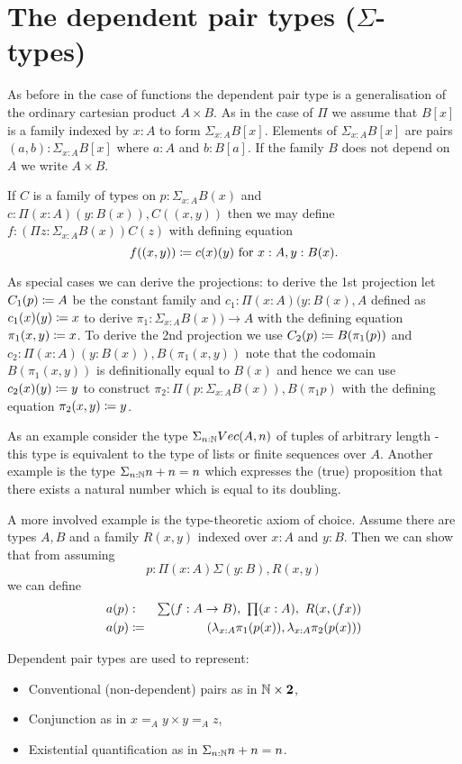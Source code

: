 \section{The dependent pair types ($\Sigma$-types)}

As before in the case of functions the dependent pair type is a
generalisation of the ordinary cartesian product $A \times B$. 
As in the case of $\Pi$ we assume that $B[x]$ is a family indexed by
$x:A$ to form $\Sigma_{x:A}B[x]$. Elements of $\Sigma_{x:A}B[x]$ are
pairs $(a,b) : \Sigma_{x:A}B[x]$ where $a:A$ and $b:B[a]$. If the
family $B$ does not depend on $A$ we write $A \times B$.

If $C$ is a family of types on $p:\Sigma_{x:A}B(x)$ and 
$c:\Pi(x:A)(y:B(x)),C((x,y))$ then we may define 
$f:(\Pi z:\Sigma_{x:A}B(x))C(z)$ with defining equation
  \[f((x,y))\coloneqq c(x)(y)\mbox{ for } x:A,y:B(x).\]

As special cases we can derive the projections: to derive the 1st
projection let $C_1(p) \coloneqq A$ be the constant family and $c_1 : \Pi (x:A)(y:B(x),A$
defined as $c_1(x)(y) \coloneqq x$ to derive $\pi_1 : \Sigma_{x:A}B(x)) \to A$
with the defining equation $\pi_1 (x,y) \coloneqq x$. To derive the 2nd
projection we use $C_2(p) \coloneqq B (\pi_1(p))$ and $c_2 : \Pi
(x:A)(y:B(x)),B(\pi_1(x,y))$ note that the codomain $B(\pi_1(x,y))$ is
definitionally equal to $B(x)$ and hence we can use $c_2(x)(y) \coloneqq
y$ to construct $\pi_2 : \Pi(p : \Sigma_{x:A}{B(x)}),B(\pi_1 p)$ with
the defining equation $\pi_2(x,y) \coloneqq y$.

As an example consider the type $\Sigma_{n:\mathbb{N}}Vec(A,n)$ of tuples of
arbitrary length - this type is equivalent to the type of lists or
finite sequences over $A$. Another example is the type
$\Sigma_{n:\mathbb{N}}n+n = n$ which expresses the (true) proposition that
there exists a natural number which is equal to its doubling.

A more involved example is the type-theoretic axiom of choice. Assume
there are types $A,B$ and a family $R(x,y)$ indexed over $x:A$ and
$y:B$. Then we can show that from assuming 
\[p : \Pi(x:A)\Sigma(y :B),R(x,y)\] 
we can define 
\begin{eqnarray*}
a(p) & : & \sm{f : A \to B} \prd{x:A} R(x,(fx)) \\
a(p) & \defeq & (\lambda_{x:A} \pi_1(p(x)),\lambda_{x:A} \pi_2(p(x)))
\end{eqnarray*}

Dependent pair types are used to represent:
\begin{itemize}
\item Conventional (non-dependent) pairs as in $\mathbb{N} \times \mathbf{2}$,
\item Conjunction as in $x =_A y \times y =_A z$,
\item Existential quantification as in $\Sigma_{n:\mathbb{N}}n+n = n$.
\end{itemize}

